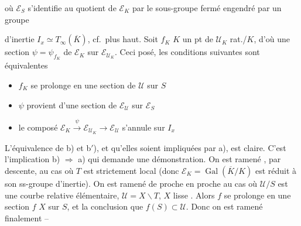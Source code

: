 \documentclass[11pt,a4paper]{article}
\begin{document}


où $\mathcal{E}_S$ s'identifie au quotient de $\mathcal{E}_K$ par le sous-groupe  fermé engendré par un groupe



d'inertie $I_{x} \simeq T_{\infty}(\overline{K})$, cf.\ plus haut. Soit $f_K$ \uncertain{$\in$} $K$ un pt de $\mathcal{U}_K$ rat./$K$, d'où une section $\psi = \psi_{f_K}$ de $\mathcal{E}_K$ sur $\mathcal{E}_{\mathcal{U}_K}$. Ceci posé, les conditions suivantes sont équivalentes
\begin{itemize}
\item[a)] $f_K$ se prolonge en une section de $\mathcal{U}$ sur $S$
\item[b)] $\psi$ provient d'une section de $\mathcal{E}_{\mathcal{U}}$ sur $\mathcal{E}_S$
\item[b$'$)] le composé $\mathcal{E}_K \xrightarrow{\psi} \mathcal{E}_{\mathcal{U}_K} \to \mathcal{E}_{\mathcal{U}}$ s'annule sur $I_x$
\end{itemize}
\struck{\ill{}}


L'équivalence de b) et b$'$), et qu'elles soient impliquées par a), est claire. C'est l'implication b) $\Longrightarrow$ a) qui demande une démonstration. On est ramené , par descente, au cas \struck{\ill{}} où $T$ est strictement local (donc $\mathcal{E}_K = \operatorname{Gal}(\overline{K}/K)$ est réduit à son ss-groupe d'inertie). On est ramené de proche en proche au cas où $\mathcal{U}/S$ est une courbe relative élémentaire,  $\mathcal{U} = X \smallsetminus T$, $X$ lisse . Alors $f$ se prolonge en une section $f$   $X$ sur $S$, et la conclusion  que $f(S) \subset \mathcal{U}$. Donc on est ramené finalement  --
\end{document}
